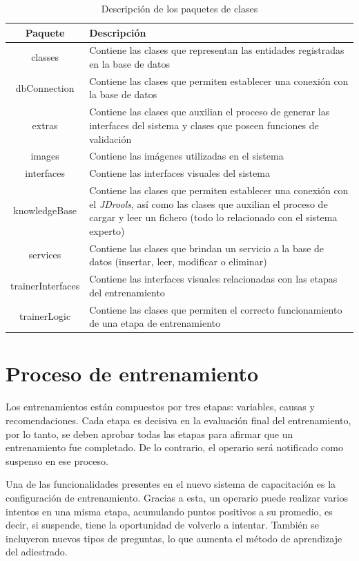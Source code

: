 \begin{table}[H]
\centering
\begin{center}
\begin{tabular}{ | c | p{11.5cm} | }
\hline
\textbf{Paquete} & \textbf{Descripción}\\
\hline
classes & Contiene las clases que representan las entidades registradas en la base de datos \\
\hline
dbConnection & Contiene las clases que permiten establecer una conexión con la base de datos \\
\hline
extras & Contiene las clases que auxilian el proceso de generar las interfaces del sistema y clases que poseen funciones de validación \\
\hline
images & Contiene las imágenes utilizadas en el sistema \\
\hline
interfaces & Contiene las interfaces visuales del sistema \\
\hline
knowledgeBase & Contiene las clases que permiten establecer una conexión con el \textsl{JDrools}, así como las clases que auxilian el proceso de cargar y leer un fichero (todo lo relacionado con el sistema experto) \\
\hline
services & Contiene las clases que brindan un servicio a la base de datos (insertar, leer, modificar o eliminar) \\
\hline
trainerInterfaces & Contiene las interfaces visuales relacionadas con las etapas del entrenamiento \\
\hline
trainerLogic &  Contiene las clases que permiten el correcto funcionamiento de una etapa de entrenamiento \\
\hline
\end{tabular}
\caption{Descripción de los paquetes de clases}
\label{tab:paquetes}
\end{center}
\end{table}

\section{Proceso de entrenamiento}
Los entrenamientos están compuestos por tres etapas: variables, causas y recomendaciones. Cada etapa es decisiva en la evaluación final del entrenamiento, por lo tanto, se deben aprobar todas las etapas para afirmar que un entrenamiento fue completado. De lo contrario, el operario será notificado como suspenso en ese proceso.

Una de las funcionalidades presentes en el nuevo sistema de capacitación es la configuración de entrenamiento. Gracias a esta, un operario puede realizar varios intentos en una misma etapa, acumulando puntos positivos a su promedio, es decir, si suspende, tiene la oportunidad de volverlo a intentar. También se incluyeron nuevos tipos de preguntas, lo que aumenta el método de aprendizaje del adiestrado. 

